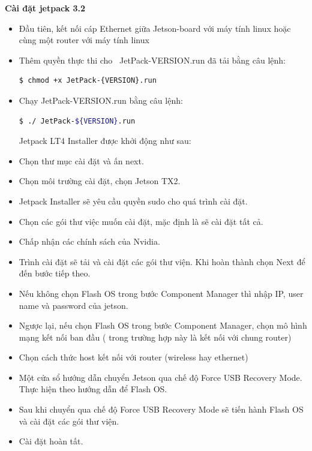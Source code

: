 \documentclass[a4paper]{report}
\begin{document}
\textbf{Cài đặt jetpack 3.2} 
\begin{itemize}
	\item Đầu tiên, kết nối cáp Ethernet giữa Jetson-board với máy tính linux hoặc cùng một router với máy tính linux
	\item Thêm quyền thực thi cho  JetPack-{VERSION}.run đã tải bằng câu lệnh:
		\begin{lstlisting}[language=bash, frame=single]
			$ chmod +x JetPack-{VERSION}.run
		\end{lstlisting}
	\item Chạy JetPack-{VERSION}.run bằng câu lệnh:
		\begin{lstlisting}[language=bash, frame=single]
			$ ./ JetPack-${VERSION}.run
		\end{lstlisting}

	
		Jetpack LT4 Installer được khởi động như sau:
	\item Chọn thư mục cài đặt và ấn next.
	\item Chọn môi trường cài đặt, chọn Jetson TX2.
	\item Jetpack Installer sẽ yêu cầu quyền sudo cho quá trình cài đặt.
	\item Chọn các gói thư việc muốn cài đặt, mặc định là sẽ cài đặt tất cả.
	\item Chấp nhận các chính sách của Nvidia.
	\item Trình cài đặt sẽ tải và cài đặt các gói thư viện. Khi hoàn thành  chọn Next để đến bước tiếp theo.
	\item Nếu không chọn Flash OS trong bước Component Manager thì nhập IP, user name và password của jetson.
	\item Ngược lại, nếu chọn Flash OS trong bước Component Manager, chọn mô hình mạng kết nối ban đầu ( trong trường hợp này là kết nối với chung router) 
	\item Chọn cách thức host kết nối với router (wireless hay ethernet)
	\item Một cửa sổ hướng dẫn chuyển Jetson qua chế độ Force USB Recovery Mode. Thực hiện theo hướng dẫn để Flash OS.
	\item Sau khi chuyển qua chế độ Force USB Recovery Mode sẽ tiến hành Flash OS và cài đặt các gói thư viện.
	\item Cài đặt hoàn tất.
\end{itemize}
\end{document}
